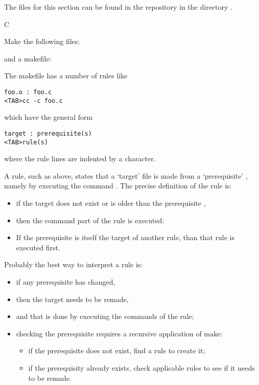 The files for this section can be found in the repository in the
directory
.

 {C}

Make the following files:

and a makefile:

The makefile has a number of rules like
\begin{verbatim}
foo.o : foo.c
<TAB>cc -c foo.c
\end{verbatim}
which have the general form
\begin{verbatim}
target : prerequisite(s)
<TAB>rule(s)
\end{verbatim}
where the rule lines are indented by a  character.

A rule, such as above, states that a `target' file  is made
from a `prerequisite' , namely by executing the command . The precise definition of the rule is:
\begin{itemize}
\item if the target  does not exist or is older than the
  prerequisite ,
\item then the command part of the rule is executed: 
\item If the prerequisite is itself the target of another rule, than that
  rule is executed first.
\end{itemize}
Probably the best way to interpret a rule is:
\begin{itemize}
\item if any prerequisite has changed,
\item then the target needs to be remade,
\item and that is done by executing the commands of the rule;
\item checking the prerequisite requires a recursive application of
  make:
  \begin{itemize}
  \item if the prerequisite does not exist, find a rule to create it;
  \item if the prerequisity already exists, check applicable rules to
    see if it needs to be remade.
  \end{itemize}
\end{itemize}

